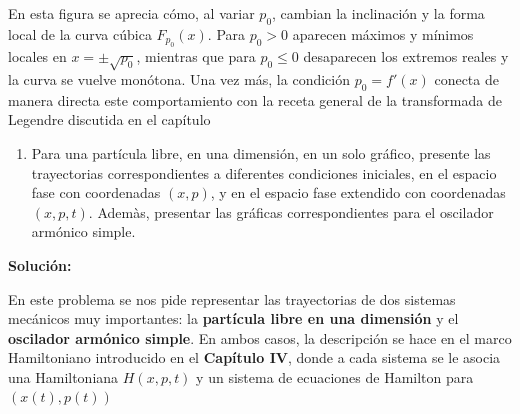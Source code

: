 \documentclass{article}
\newenvironment{AGbox}[1][7]%
{%
  \begin{tcolorbox}[
    enhanced, breakable,
    colframe=AppleGreen,
    colback=AppleGreen!#1,
    boxrule=1pt,
    borderline west={2mm}{-10mm}{AppleGreen},
    sharp corners=southwest,
    left=14pt,right=14pt,top=10pt,bottom=10pt,
     boxsep=6pt,
  ]%
}{%
  \end{tcolorbox}%
}
\begin{document}
\begin{center}
\end{center}

En esta figura se aprecia cómo, al variar \(p_{0}\), cambian la inclinación y la forma
local de la curva cúbica \(F_{p_{0}}(x)\). Para \(p_{0}>0\) aparecen máximos y mínimos
locales en \(x=\pm\sqrt{p_{0}}\), mientras que para \(p_{0}\leq 0\) desaparecen los
extremos reales y la curva se vuelve monótona. Una vez más, la condición
\(p_{0}=f'(x)\) conecta de manera directa este comportamiento con la receta general de
la transformada de Legendre discutida en el capítulo


\begin{AGbox}[8]
\begin{enumerate}[label={{\textcolor{trueblue}{\textbf{Pr.} 4.2}}}]
  \item Para una partícula libre, en una dimensión, en un solo gráfico, presente las trayectorias correspondientes a diferentes condiciones iniciales, en el espacio fase con coordenadas $(x,p)$, y en el espacio fase extendido con coordenadas $(x,p,t)$. Ademàs, presentar las gráficas correspondientes para el oscilador armónico simple.
\end{enumerate}
\end{AGbox}
\vspace{0.5cm}

\textcolor{Cinnabar}{\textbf{Solución:}} \vspace{0.5cm}

En este problema se nos pide representar las trayectorias de dos sistemas mecánicos
muy importantes: la \textbf{partícula libre en una dimensión} y el \textbf{oscilador
armónico simple}.  
En ambos casos, la descripción se hace en el marco Hamiltoniano introducido en
el \textbf{Capítulo IV}, donde a cada sistema se le asocia una Hamiltoniana $H(x,p,t)$
y un sistema de ecuaciones de Hamilton para $(x(t),p(t))$
\end{document}
